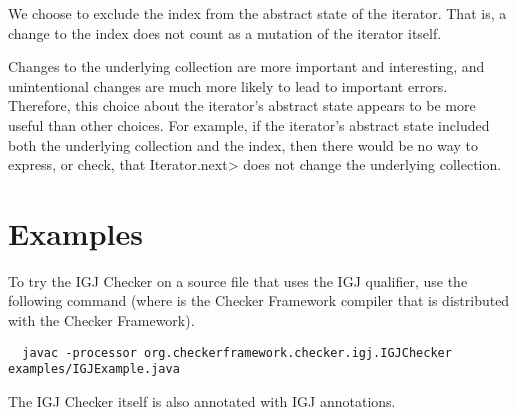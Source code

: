 We choose to exclude the index from the abstract state of the iterator.
That is, a change to the index does not count as a mutation of the
iterator itself.

Changes to the underlying collection are more important and interesting,
and unintentional changes are much more likely to lead to important
errors.  Therefore, this choice about the iterator's abstract state
appears to be more useful than other choices.  For example, if the
iterator's abstract state included both the underlying collection and
the index, then there would be no way to express, or check, that
\<Iterator.next> does not change the underlying collection.


\section{Examples\label{igj-example}}

To try the IGJ Checker on a source file that uses the IGJ qualifier, use
the following command (where  is the Checker Framework compiler that
is distributed with the Checker Framework).

\begin{Verbatim}
  javac -processor org.checkerframework.checker.igj.IGJChecker examples/IGJExample.java
\end{Verbatim}

The IGJ Checker itself is also annotated with IGJ annotations.


